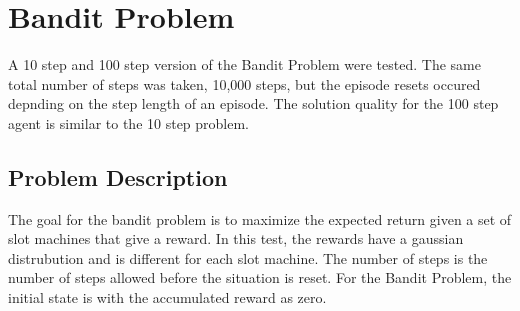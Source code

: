 
\section{Bandit Problem}
A 10 step and 100 step version of the Bandit Problem were tested.  The same total number of steps was taken, 10,000 steps, but the episode resets occured depnding on the step length of an episode.  The solution quality for the 100 step agent is similar to the 10 step problem.

\subsection{Problem Description}
The goal for the bandit problem is to maximize the expected return given a set of slot machines that give a reward.  In this test, the rewards have a gaussian distrubution and is different for each slot machine.  The number of steps is the number of steps allowed before the situation is reset.  For the Bandit Problem, the initial state is with the accumulated reward as zero.

